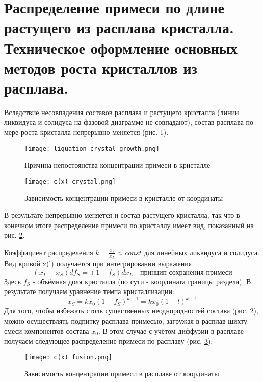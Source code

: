 \section{Распределение примеси по длине растущего из расплава кристалла.
Техническое оформление основных методов роста кристаллов из расплава.}
Вследствие несовпадения составов расплава и растущего кристалла (линии ликвидуса и солидуса на фазовой диаграмме не совпадают), состав расплава по мере роста кристалла непрерывно меняется (рис. \ref{fig:liquation_crystal_growth}). 
\begin{figure}[h!]
\centering
\texttt{[image: liquation\_crystal\_growth.png]}\caption{Причина непостоянства концентрации примеси в кристалле}\label{fig:liquation_crystal_growth}
\end{figure}
\begin{figure}[h!]
\centering
\texttt{[image: c(x)\_crystal.png]}\caption{Зависимость концентрации примеси в кристалле от координаты}\label{fig:c(x)_crystal}
\end{figure}
В результате непрерывно меняется и состав растущего кристалла, так что в конечном итоге распределение примеси по кристаллу имеет вид, показанный на рис. \ref{fig:c(x)_crystal}. 
\par Коэффициент распределения $k=\frac{x_s}{x_L}\approx const$ для линейных ликвидуса и солидуса. Вид кривой x(l) получается при интегрировании выражения 
\begin{equation}
(x_L-x_S)df_S=(1-f_S)dx_L \text{   - принцип сохранения примеси}
\label{eq:impurity_conservation}  
\end{equation}
Здесь $f_S$ - объёмная доля кристалла (по сути - координата границы раздела). В результате получаем уравнение темпа кристаллизации:
\begin{equation}
x_S = kx_0 (1-f_S)^{k-1} = kx_0 (1-l)^{k-1} 
\label{eq:crystallization_rate}  
\end{equation}
Для того, чтобы избежать столь существенных неоднородностей состава (рис. \ref{fig:c(x)_crystal}), можно осуществлять подпитку расплава примесью, загружая в расплав шихту смеси компонентов состава $x_0$. В этом случае с учётом диффузии в расплаве получаем следующее распределение примеси по расплаву (рис. \ref{fig:c(x)_fusion}):
\begin{figure}[h!]
\centering
\texttt{[image: c(x)\_fusion.png]}\caption{Зависимость концентрации примеси в расплаве от координаты}\label{fig:c(x)_fusion}
\end{figure}
